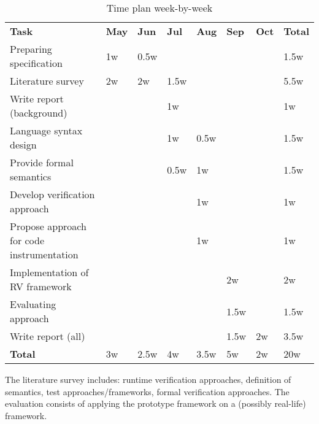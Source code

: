 \documentclass[a4paper,11pt]{article}
\begin{document}
\begin{center}
	\renewcommand{\arraystretch}{1.5}
	\begin{table}[h!b!p!]

	\begin{tabular}{ p{4cm} | l l l l l l | l }
        \textbf{Task} & \textbf{May} & \textbf{Jun} & \textbf{Jul} &
        \textbf{Aug} & \textbf{Sep} & \textbf{Oct} &
        \textbf{Total} \\
		\noalign{\smallskip}\hline\noalign{\smallskip}

        Preparing specification &
        1w & 0.5w  & & & & & 1.5w \\

        Literature survey &
        2w & 2w & 1.5w & & & & 5.5w \\

        Write report (background) &
        & & 1w & & & & 1w \\

        Language syntax design &
        & & 1w & 0.5w & & & 1.5w \\

        Provide formal semantics &
        & & 0.5w & 1w & & & 1.5w \\

        Develop verification approach &
        & & & 1w & & & 1w \\

        Propose approach for code instrumentation &
        & & & 1w & & & 1w \\

        Implementation of RV framework &
        & & & & 2w & & 2w \\

        Evaluating approach &
        & & & & 1.5w & & 1.5w \\

        Write report (all) &
        & & & & 1.5w & 2w & 3.5w \\

		\noalign{\smallskip}\hline\noalign{\smallskip}
        \textbf{Total} &
        3w & 2.5w & 4w & 3.5w & 5w & 2w & 20w \\

	\end{tabular}
	\caption{Time plan week-by-week}
	\end{table}
\end{center}

The literature survey includes: runtime verification approaches, definition of
semantics, test approaches/frameworks, formal verification approaches. The
evaluation consists of applying the prototype framework on a (possibly
real-life) framework.
\end{document}
